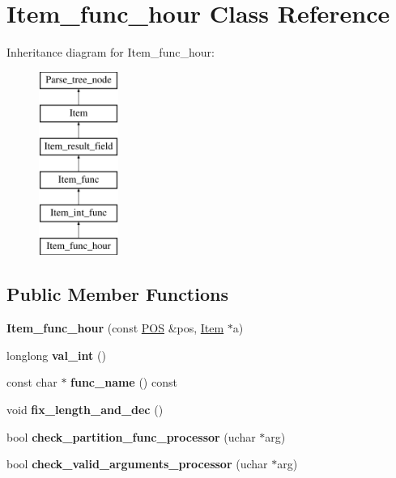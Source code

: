 \hypertarget{classItem__func__hour}{}\section{Item\+\_\+func\+\_\+hour Class Reference}
\label{classItem__func__hour}
Inheritance diagram for Item\+\_\+func\+\_\+hour\+:\begin{figure}[H]
\begin{center}
\leavevmode
\includegraphics[height=6.000000cm]{classItem__func__hour}
\end{center}
\end{figure}
\subsection*{Public Member Functions}
\begin{DoxyCompactItemize}
\item 
\mbox{\label{classItem__func__hour_a792fd79b8a3f9734393f6a6d9729ce62}} 
{\bfseries Item\+\_\+func\+\_\+hour} (const \mbox{\hyperlink{structYYLTYPE}{P\+OS}} \&pos, \mbox{\hyperlink{classItem}{Item}} $\ast$a)
\item 
\mbox{\label{classItem__func__hour_adf3ef5c56206c6a912405e07d2df8936}} 
longlong {\bfseries val\+\_\+int} ()
\item 
\mbox{\label{classItem__func__hour_a121d894931a0ad18c0049a3589cd9ff4}} 
const char $\ast$ {\bfseries func\+\_\+name} () const
\item 
\mbox{\label{classItem__func__hour_aec6350c4a46109545cc9820024c172d9}} 
void {\bfseries fix\+\_\+length\+\_\+and\+\_\+dec} ()
\item 
\mbox{\label{classItem__func__hour_a179271d6fc3d9a5f0bb4899d39242d7a}} 
bool {\bfseries check\+\_\+partition\+\_\+func\+\_\+processor} (uchar $\ast$arg)
\item 
\mbox{\label{classItem__func__hour_a266bd149081997ac0571a33d2de7f08e}} 
bool {\bfseries check\+\_\+valid\+\_\+arguments\+\_\+processor} (uchar $\ast$arg)
\end{DoxyCompactItemize}
